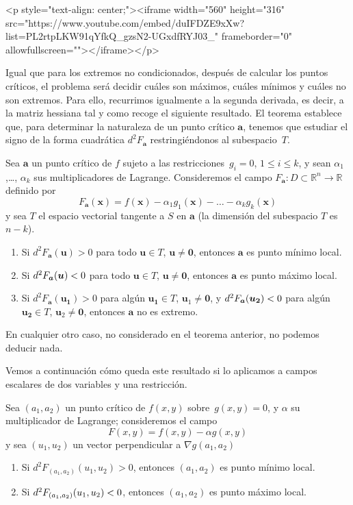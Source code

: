 \begin{rawhtml}
<p style="text-align: center;"><iframe width="560" height="316" src="https://www.youtube.com/embed/duIFDZE9xXw?list=PL2rtpLKW91qYfkQ_gzsN2-UGxdfRYJ03_" frameborder="0" allowfullscreen=""></iframe></p>
\end{rawhtml}


Igual que para los extremos no condicionados, después de calcular los puntos críticos, el problema será decidir cuáles son máximos, cuáles mínimos y cuáles no son extremos. 
Para ello, recurrimos igualmente a la segunda derivada, es decir, a la matriz hessiana tal y como recoge el siguiente resultado.
El teorema establece que, para determinar la naturaleza de un punto crítico $\boldsymbol{a}$, tenemos que estudiar el signo de la forma cuadrática $d^2F_{\boldsymbol a}$ restringiéndonos al subespacio~$T$.


\begin{teorema} Sea $\boldsymbol{a}$ un punto crítico de $f$ sujeto a las restricciones~$g_i=0$,
$1\le i\le k$, y sean $\alpha_1$,\dots, $\alpha_k$ sus multiplicadores de Lagrange. Consideremos el campo $F_{\boldsymbol a}\colon
\mathit{D}\subset\mathbb{R}^n\to\mathbb{R}$ definido por
\[
F_{\boldsymbol a}(\boldsymbol{x})=f(\boldsymbol{x})-\alpha_1g_1(\boldsymbol{x})-\dots -\alpha_kg_k(\boldsymbol{x})
\]
y sea $T$ el espacio vectorial tangente a $S$ en $\boldsymbol{a}$ (la dimensión del subespacio $T$ es $n-k$).
\begin{enumerate}
\item Si $d^2F_{\boldsymbol a}(\boldsymbol{u})>0$ para todo $\boldsymbol{u}\in T$, $\boldsymbol{u}\neq \boldsymbol 0$, entonces $\boldsymbol{a}$ es punto mínimo local.
\item Si $d^2F_{\boldsymbol a}(\boldsymbol{u})< 0$ para todo $\boldsymbol{u}\in T$, $\boldsymbol{u}\neq \boldsymbol 0$, entonces $\boldsymbol{a}$ es punto máximo local.
\item Si $d^2F_{\boldsymbol a}(\boldsymbol{u_1})>0$ para algún $\boldsymbol{u_1}\in T$, $\boldsymbol{u}_1\neq \boldsymbol 0$, y  $d^2F_{\boldsymbol a}(\boldsymbol{u_2})< 0$ para algún
$\boldsymbol{u_2}\in T$, $\boldsymbol{u}_2\neq \boldsymbol 0$, entonces $\boldsymbol{a}$ no es extremo.
\end{enumerate}
\end{teorema}
%
En cualquier otro caso, no considerado en el teorema anterior, no podemos deducir nada.

Vemos a continuación cómo queda este resultado si lo aplicamos a campos escalares de dos variables y una restricción.
%
\begin{corolario} Sea $(a_1,a_2)$ un punto crítico de $f(x,y)$ sobre~$g(x,y)=0$,
y $\alpha$ su multiplicador de Lagrange;
consideremos el campo\[
F(x,y)=f(x,y)-\alpha g(x,y)
\]
y sea $(u_1,u_2)$ un vector perpendicular a $\nabla g(a_1,a_2)$
\begin{enumerate}
\item Si $d^2F_{(a_1,a_2)}(u_1,u_2)>0$, entonces $(a_1,a_2)$ es punto mínimo local.
\item Si $d^2F_{(a_1,a_2)}(u_1,u_2)< 0$, entonces $(a_1,a_2)$ es punto máximo local.
\end{enumerate}
\end{corolario}

